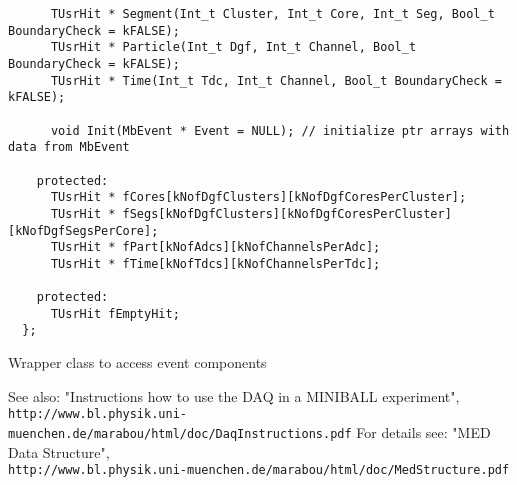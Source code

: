 \documentclass[10pt]{article}
\newenvironment{yellowboxed}
	{\begin{Sbox}\begin{minipage}[t]}
	{\end{minipage}\end{Sbox}\colorbox{yellow}{\TheSbox}}
\begin{document}
\begin{center}
\begin{table}[H]
{\begin{yellowboxed}{\linewidth}
\verb+      TUsrHit * Segment(Int_t Cluster, Int_t Core, Int_t Seg, Bool_t BoundaryCheck = kFALSE);+\\
\verb+      TUsrHit * Particle(Int_t Dgf, Int_t Channel, Bool_t BoundaryCheck = kFALSE);+\\
\verb+      TUsrHit * Time(Int_t Tdc, Int_t Channel, Bool_t BoundaryCheck = kFALSE);+\\
\verb+  +\\
\verb+      void Init(MbEvent * Event = NULL); // initialize ptr arrays with data from MbEvent+\\
\verb+  +\\
\verb+    protected:+\\
\verb+      TUsrHit * fCores[kNofDgfClusters][kNofDgfCoresPerCluster];+\\
\verb+      TUsrHit * fSegs[kNofDgfClusters][kNofDgfCoresPerCluster][kNofDgfSegsPerCore];+\\
\verb+      TUsrHit * fPart[kNofAdcs][kNofChannelsPerAdc];+\\
\verb+      TUsrHit * fTime[kNofTdcs][kNofChannelsPerTdc];+\\
\verb+  +\\
\verb+    protected:+\\
\verb+      TUsrHit fEmptyHit;+\\
\verb+  };+\\
\end{yellowboxed}}
\caption{Wrapper class to access event components}
\label{MbExp}
\end{table}
\end{center}
\newpage
\begin{thebibliography}{9}
 See also: "Instructions how to use the DAQ in a MINIBALL experiment",\\
\verb+http://www.bl.physik.uni-muenchen.de/marabou/html/doc/DaqInstructions.pdf+
 For details see: "MED Data Structure",\\
\verb+http://www.bl.physik.uni-muenchen.de/marabou/html/doc/MedStructure.pdf+
\end{thebibliography}
\end{document}
